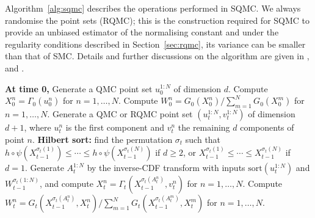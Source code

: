 

Algorithm~\ref{alg:sqmc} describes the operations performed in SQMC. We always randomise the point sets (RQMC); this is the construction required for SQMC to provide an unbiased estimator of the normalising constant \citep{chopingerber2015sqmc,delmoral1996} and under the regularity conditions described in Section~\ref{sec:rqmc}, its variance can be smaller than that of SMC. Details and further discussions on the algorithm are given in \citet{chopingerber2015sqmc}, \citet{chopingerber2017sqmcintroduction} and \citet{chopinpapaspiliopoulos020introtosmc}.

\begin{algorithm}[H]
\caption{SQMC}
\label{alg:sqmc}
\begin{algorithmic}[1]
\State \textbf{At time 0,}
\State Generate a QMC point set $u_0^{1:N}$ of dimension $d$.
\State Compute $X_0^n = \Gamma_0(u_0^n)$ for $n = 1, \ldots, N$.
\State Compute $W_0^n = G_0(X_0^n) / \sum_{m=1}^N G_0(X_0^m)$ for $n = 1, \ldots, N$.
    \State Generate a QMC or RQMC point set $(u_t^{1:N}, v_t^{1:N})$ of dimension $d+1$, where $u_t^n$ is the first component and $v_t^n$ the remaining $d$ components of point $n$.
    \State \textbf{Hilbert sort:} find the permutation $\sigma_t$ such that $h \circ \psi(X_{t-1}^{\sigma_t(1)}) \leq \cdots \leq h \circ \psi(X_{t-1}^{\sigma_t(N)})$ if $d \geq 2$, or $X_{t-1}^{\sigma_t(1)} \leq \cdots \leq X_{t-1}^{\sigma_t(N)}$ if $d = 1$.
    \State Generate $A_t^{1:N}$ by the inverse-CDF transform with inputs $\mathrm{sort}(u_t^{1:N})$ and $W_{t-1}^{\sigma_t(1:N)}$, and compute $X_t^n = \Gamma_t(X_{t-1}^{\sigma_t(A_t^n)}, v_t^n)$ for $n = 1, \ldots, N$.
    \State Compute $W_t^n = G_t(X_{t-1}^{\sigma_t(A_t^n)}, X_t^n) / \sum_{m=1}^N G_t(X_{t-1}^{\sigma_t(A_t^m)}, X_t^m)$ for $n = 1, \ldots, N$.
\EndFor
\end{algorithmic}
\end{algorithm}

